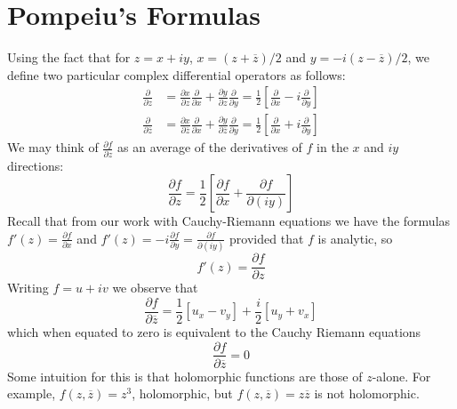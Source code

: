 \section{Pompeiu's Formulas}


Using the fact that for $z = x+iy$, $x = (z+\overline{z})/2$ and $y = -i(z-\overline{z})/2$, we define two particular complex differential operators as follows: \begin{align*}
    \frac{\partial}{\partial z} &= \frac{\partial x}{\partial z}\frac{\partial}{\partial x}+\frac{\partial y}{\partial z}\frac{\partial}{\partial y} = \frac{1}{2}\left[\frac{\partial}{\partial x}-i\frac{\partial}{\partial y}\right] \\
    \frac{\partial}{\partial \overline{z}} &= \frac{\partial x}{\partial \overline{z}}\frac{\partial}{\partial x}+\frac{\partial y}{\partial \overline{z}}\frac{\partial}{\partial y} = \frac{1}{2}\left[\frac{\partial}{\partial x}+i\frac{\partial}{\partial y}\right]
\end{align*}
We may think of $\frac{\partial f}{\partial z}$ as an average of the derivatives of $f$ in the $x$ and $iy$ directions: \begin{equation*}
    \frac{\partial f}{\partial z} = \frac{1}{2}\left[\frac{\partial f}{\partial x}+\frac{\partial f}{\partial(iy)}\right]
\end{equation*}
Recall that from our work with Cauchy-Riemann equations we have the formulas $f'(z) = \frac{\partial f}{\partial x}$ and $f'(z) = -i\frac{\partial f}{\partial y} = \frac{\partial f}{\partial(iy)}$ provided that $f$ is analytic, so \begin{equation*}
    f'(z) = \frac{\partial f}{\partial z}
\end{equation*}
Writing $f = u+iv$ we observe that \begin{equation*}
    \frac{\partial f}{\partial \overline{z}} = \frac{1}{2}\left[u_x -v_y\right]+\frac{i}{2}\left[u_y+v_x\right]
\end{equation*}
which when equated to zero is equivalent to the Cauchy Riemann equations \begin{equation*}
    \frac{\partial f}{\partial \overline{z}} = 0
\end{equation*}
Some intuition for this is that holomorphic functions are those of $z$-alone. For example, $f(z,\overline{z}) = z^3$, holomorphic, but $f(z,\overline{z}) = z\overline{z}$ is not holomorphic. 

